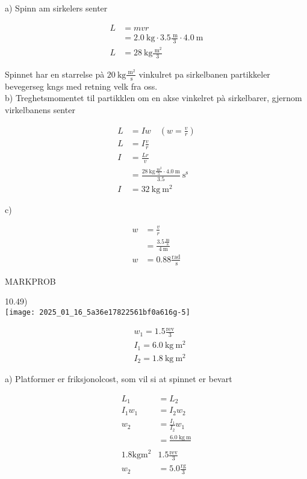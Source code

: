 \documentclass[10pt]{article}
\begin{document}
a) Spinn am sirkelers senter

$$
\begin{aligned}
L & =m v r \\
& =2.0 \mathrm{~kg} \cdot 3.5 \frac{\mathrm{~m}}{3} \cdot 4.0 \mathrm{~m} \\
L & =28 \mathrm{~kg} \frac{\mathrm{~m}^{2}}{3}
\end{aligned}
$$

Spinnet har en starrelse pà $20 \mathrm{~kg} \frac{\mathrm{~m}^{2}}{\mathrm{~s}}$ vinkulret pa sirkelbanen partikkeler bevegerseg kngs med retning velk fra oss.\\
b) Treghetsmomentet til partikklen om en akse vinkelret pà sirkelbarer, gjernom virkelbanens senter

$$
\begin{aligned}
L & =I w \quad\left(w=\frac{v}{r}\right) \\
L & =I \frac{v}{r} \\
I & =\frac{L r}{v} \\
& =\frac{28 \mathrm{~kg} \frac{\mathrm{~m}^{2}}{5} \cdot 4.0 \mathrm{~m}}{3.5} \mathrm{~s}^{\mathrm{s}} \\
I & =32 \mathrm{~kg} \mathrm{~m}^{2}
\end{aligned}
$$

c)

$$
\begin{aligned}
w & =\frac{v}{r} \\
& =\frac{3.5 \frac{\mathrm{~m}}{\mathrm{~s}}}{4 \mathrm{~m}} \\
w & =0.88 \frac{\mathrm{rad}}{\mathrm{~s}}
\end{aligned}
$$

MARKPROB

10.49)\\
\texttt{[image: 2025\_01\_16\_5a36e17822561bf0a616g-5]}

$$
\begin{aligned}
& w_{1}=1.5 \frac{\mathrm{rev}}{3} \\
& I_{1}=6.0 \mathrm{~kg} \mathrm{~m}^{2} \\
& I_{2}=1.8 \mathrm{~kg} \mathrm{~m}^{2}
\end{aligned}
$$

a) Platformer er friksjonolcost, som vil si at spinnet er bevart

$$
\begin{array}{rl}
L_{1} & =L_{2} \\
I_{1} w_{1} & =I_{2} w_{2} \\
w_{2} & =\frac{I_{1}}{I_{2}} w_{1} \\
& =\frac{6.0 \mathrm{~kg} \mathrm{~m}}{} \\
1.8 \mathrm{kgm}^{2} & 1.5 \frac{\mathrm{rev}}{3} \\
w_{2} & =5.0 \frac{\mathrm{rg}}{3}
\end{array}
$$
\end{document}

